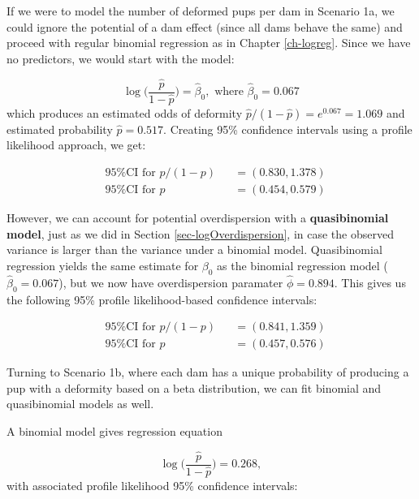 \documentclass[
]{krantz}
\begin{document}
If we were to model the number of deformed pups per dam in Scenario 1a, we could ignore the potential of a dam effect (since all dams behave the same) and proceed with regular binomial regression as in Chapter \ref{ch-logreg}. Since we have no predictors, we would start with the model:

\begin{equation*}
  \log \bigg( \frac{\hat{p}}{1-\hat{p}} \bigg) = \hat{\beta}_0, \textrm{ where } \hat{\beta}_0 = 0.067
\end{equation*}
which produces an estimated odds of deformity \(\widehat{p}/(1-\widehat{p}) = e^{0.067} = 1.069\) and estimated probability \(\widehat{p} = 0.517\). Creating 95\% confidence intervals using a profile likelihood approach, we get:



\[
\begin{alignedat}{2}
  &\textrm{95\% CI for } p/(1-p) &&= (0.830, 1.378) \\
  &\textrm{95\% CI for } p       &&= (0.454, 0.579)
\end{alignedat}
\]

However, we can account for potential overdispersion  with a \textbf{quasibinomial model},  just as we did in Section \ref{sec-logOverdispersion}, in case the observed variance is larger than the variance under a binomial model. Quasibinomial regression yields the same estimate for \(\beta_0\) as the binomial regression model (\(\hat{\beta}_0 = 0.067\)), but we now have overdispersion paramater \(\widehat{\phi} = 0.894\). This gives us the following 95\% profile likelihood-based confidence intervals:

\[
\begin{alignedat}{2}
  &\textrm{95\% CI for } p/(1-p) &&= (0.841, 1.359) \\
  &\textrm{95\% CI for } p       &&= (0.457, 0.576)
\end{alignedat}
\]

Turning to Scenario 1b, where each dam has a unique probability of producing a pup with a deformity based on a beta distribution, we can fit binomial and quasibinomial models as well.

A binomial model gives regression equation

\begin{equation*}
  \log\bigg(\frac{\hat{p}}{1-\hat{p}}\bigg) = 0.268,
\end{equation*}
with associated profile likelihood 95\% confidence intervals:
\end{document}
